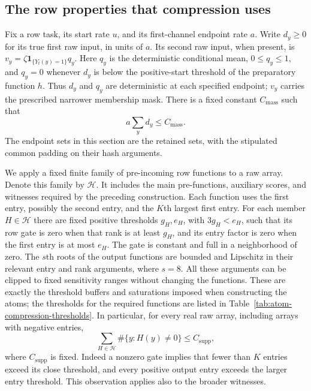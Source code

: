 \subsection{The row properties that compression uses}
\label{subsec:buf-interface}
Fix a row task, its start rate $u$, and its first-channel endpoint rate $a$.
Write $d_y\geq0$ for its true first raw input, in units of $a$.  Its second
raw input, when present, is $v_y=\zeta\mathbf1_{\{Y_t(y)=1\}}q_y$.
Here $q_y$ is the deterministic conditional mean, $0\leq q_y\leq1$, and
$q_y=0$ whenever $d_y$ is below the positive-start threshold of the
preparatory function $h$.  Thus $d_y$ and $q_y$ are deterministic at each
specified endpoint; $v_y$ carries the prescribed narrower membership mask.
There is a fixed constant $C_{\mathrm{mass}}$ such that
\begin{equation}
 a\sum_y d_y\leq C_{\mathrm{mass}}.
 \label{eq:buf-mass}
\end{equation}
The endpoint sets in this section are the retained sets, with the stipulated
common padding on their hash arguments.

We apply a fixed finite family of pre-incoming row functions to a raw array.
Denote this family by $\mathcal H$.  It includes the main pre-functions,
auxiliary scores, and witnesses required by the preceding construction.
Each function uses the first entry, possibly the second entry, and the
$K$th largest first entry.  For each member $H\in\mathcal H$ there are fixed
positive thresholds $g_H,e_H$, with $3g_H<e_H$, such that its row gate is
zero when that rank is at least $g_H$, and its entry factor is zero when the
first entry is at most $e_H$.  The gate is constant and full in a neighborhood
of zero.  The $s$th roots of the output functions are bounded and Lipschitz
in their relevant entry and rank arguments, where $s=8$.  All these arguments
can be clipped to fixed sensitivity ranges without changing the functions.
These are exactly the threshold buffers and saturations imposed when
constructing the atoms; the thresholds for the required functions are
listed in Table~\ref{tab:atom-compression-thresholds}.  In particular,
for every real raw array, including
arrays with negative entries,
\begin{equation}
 \sum_{H\in\mathcal H}\#\{y:H(y)\ne0\}\leq C_{\mathrm{supp}},
 \label{eq:buf-row-support}
\end{equation}
where $C_{\mathrm{supp}}$ is fixed.  Indeed a nonzero gate implies that fewer
than $K$ entries exceed its close threshold, and every positive output entry
exceeds the larger entry threshold.  This observation applies also to the
broader witnesses.

